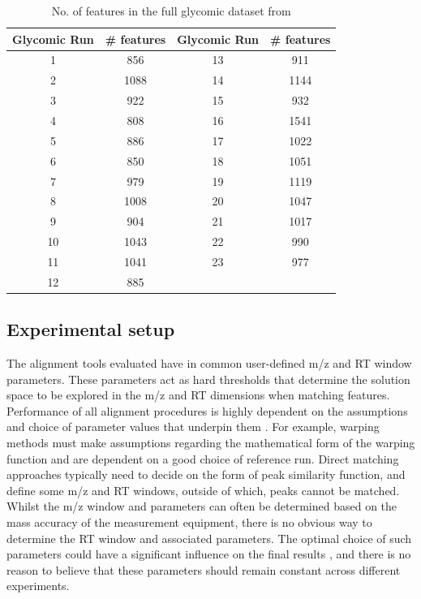 \begin{table}[!htbp]
\noindent \begin{centering}
\begin{tabular}{|c|c|c|c|}
\hline 
\textbf{Glycomic Run} & \textbf{\# features} & \textbf{Glycomic Run} & \textbf{\# features}\tabularnewline
\hline 
\hline 
1 & 856 & 13 & 911\tabularnewline
\hline 
2 & 1088 & 14 & 1144\tabularnewline
\hline 
3 & 922 & 15 & 932\tabularnewline
\hline 
4 & 808 & 16 & 1541\tabularnewline
\hline 
5 & 886 & 17 & 1022\tabularnewline
\hline 
6 & 850 & 18 & 1051\tabularnewline
\hline 
7 & 979 & 19 & 1119\tabularnewline
\hline 
8 & 1008 & 20 & 1047\tabularnewline
\hline 
9 & 904 & 21 & 1017\tabularnewline
\hline 
10 & 1043 & 22 & 990\tabularnewline
\hline 
11 & 1041 & 23 & 977\tabularnewline
\hline 
12 & 885 &  & \tabularnewline
\hline 
\end{tabular}
\par\end{centering}

\caption{No. of features in the full glycomic dataset from \cite{Tsai2013a}\label{tab:No.-of-features-glycomic}}
\end{table}

\subsection{Experimental setup\label{sub:experimental-setup}}

The alignment tools evaluated have in common user-defined \ac{m/z} and \ac{RT} window parameters. These parameters act as hard thresholds that determine the solution space to be explored in the \ac{m/z} and \ac{RT} dimensions when matching features. Performance of all alignment procedures is highly dependent on the assumptions and choice of parameter values that underpin them \cite{Smith2013}. For example, warping methods must make assumptions regarding the mathematical form of the warping function and are dependent on a good choice of reference run. Direct matching approaches typically need to decide on the form of peak similarity function, and define some \ac{m/z} and \ac{RT} windows, outside of which, peaks cannot be matched. Whilst the \ac{m/z} window and parameters can often be determined based on the mass accuracy of the measurement equipment, there is no obvious way to determine the \ac{RT} window and associated parameters. The optimal choice of such parameters could have a significant influence on the final results \cite{Smith2013}, and there is no reason to believe that these parameters should remain constant across different experiments. 

